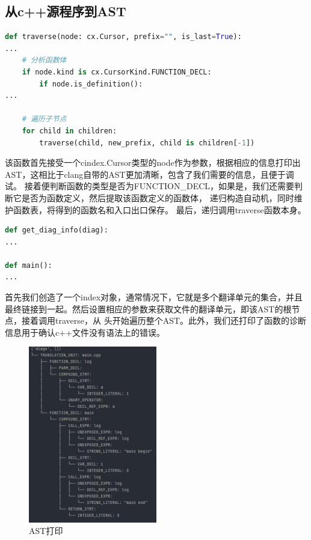 \subsection{从c++源程序到AST}
{\small 
\begin{lstlisting}[language=Python,caption=traverse]
def traverse(node: cx.Cursor, prefix="", is_last=True):
...
    # 分析函数体
    if node.kind is cx.CursorKind.FUNCTION_DECL:
        if node.is_definition():
...

    # 遍历子节点
    for child in children:
        traverse(child, new_prefix, child is children[-1])

\end{lstlisting}
}
该函数首先接受一个cindex.Cursor类型的node作为参数，根据相应的信息打印出AST，这相比于clang自带的AST更加清晰，包含了我们需要的信息，且便于调试。
接着便判断函数的类型是否为FUNCTION\_DECL，如果是，我们还需要判断它是否为函数定义，然后提取该函数定义的函数体，
递归构造自动机，同时维护函数表，将得到的函数名和入口出口保存。
最后，递归调用traverse函数本身。
{\small
\begin{lstlisting}[language=Python,caption=main]
def get_diag_info(diag):
...

def main():
...
\end{lstlisting}
}
首先我们创造了一个index对象，通常情况下，它就是多个翻译单元的集合，并且最终链接到一起。然后设置相应的参数来获取文件的翻译单元，即该AST的根节点，接着调用traverse，从
头开始遍历整个AST。此外，我们还打印了函数的诊断信息用于确认c++文件没有语法上的错误。
\begin{figure}[htbp]
	\centering
	\includegraphics[width=0.5\textwidth]{pictures/AST打印.png}
	\caption{AST打印}
	\label{fig:AST打印}
\end{figure}
